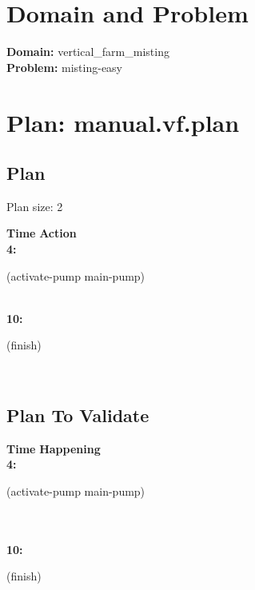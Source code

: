 \documentclass[a4paper,12pt]{article}
\author{\mbox{\sc {\sc Val}}}
\newcommand{\headingtimeaction}{{\bf Time} \qquad \= {\bf Action}\\[0.8ex]}
\newcommand{\headingtimehappening}{{\bf Time} \qquad \= {\bf Happening}\\[0.8ex]}
\newcommand{\atime}[1]{{\bf #1:}}
\newcommand{\action}[1]{{\sf #1}}
\newcommand{\listrow}[1]{\begin{minipage}[t]{11.5cm} #1 \end{minipage}}
\begin{document}
 \maketitle 
\section{Domain and Problem}
{\bf Domain:} vertical\_farm\_misting\\
{\bf Problem:} misting-easy
\section{\sloppy Plan: manual.vf.plan}
\subsection{Plan}
Plan size: 2
\begin{tabbing}
\headingtimeaction 
\atime{4} \> \listrow{\action{(activate-pump main-pump)}}\\
\atime{10} \> \listrow{\action{(finish)}}\\
\end{tabbing}
\subsection{Plan To Validate}
\begin{tabbing}
\headingtimehappening 
\atime{4}  \> \listrow{\action{(activate-pump main-pump)}}\\
\\\atime{10}  \> \listrow{\action{(finish)}}\\
\end{tabbing}
\end{document}
